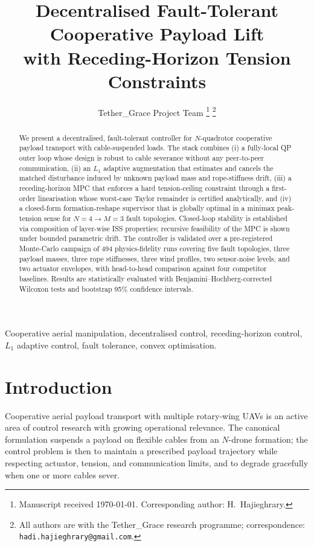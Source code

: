 \documentclass[journal,twocolumn,10pt]{IEEEtran}
\title{Decentralised Fault-Tolerant Cooperative Payload Lift\\
       with Receding-Horizon Tension Constraints}
\author{Tether\_Grace Project Team%
  \thanks{Manuscript received \today. Corresponding author: H.~Hajieghrary.}%
  \thanks{All authors are with the Tether\_Grace research programme;
  correspondence: \texttt{hadi.hajieghrary@gmail.com}.}}
\begin{document}
\maketitle

\begin{abstract}
We present a decentralised, fault-tolerant controller for
$N$-quadrotor cooperative payload transport with cable-suspended
loads. The stack combines (i) a fully-local QP outer loop whose
design is robust to cable severance without any peer-to-peer
communication, (ii) an $L_1$ adaptive augmentation that estimates and
cancels the matched disturbance induced by unknown payload mass and
rope-stiffness drift, (iii) a receding-horizon MPC that enforces a
hard tension-ceiling constraint through a first-order linearisation
whose worst-case Taylor remainder is certified analytically, and
(iv) a closed-form formation-reshape supervisor that is globally
optimal in a minimax peak-tension sense for $N=4\to M=3$ fault
topologies. Closed-loop stability is established via composition of
layer-wise ISS properties; recursive feasibility of the MPC is shown
under bounded parametric drift. The controller is validated over a
pre-registered Monte-Carlo campaign of 494 physics-fidelity runs
covering five fault topologies, three payload masses, three rope
stiffnesses, three wind profiles, two sensor-noise levels, and two
actuator envelopes, with head-to-head comparison against four
competitor baselines. Results are statistically evaluated with
Benjamini--Hochberg-corrected Wilcoxon tests and bootstrap 95\%
confidence intervals.
\end{abstract}

\begin{IEEEkeywords}
Cooperative aerial manipulation, decentralised control, receding-horizon
control, $L_1$ adaptive control, fault tolerance, convex
optimisation.
\end{IEEEkeywords}

\section{Introduction}
\label{sec:intro}

Cooperative aerial payload transport with multiple rotary-wing UAVs
is an active area of control research with growing operational
relevance. The canonical formulation suspends a payload on flexible
cables from an $N$-drone formation; the control problem is then to
maintain a prescribed payload trajectory while respecting actuator,
tension, and communication limits, and to degrade gracefully when
one or more cables sever.
\end{document}
